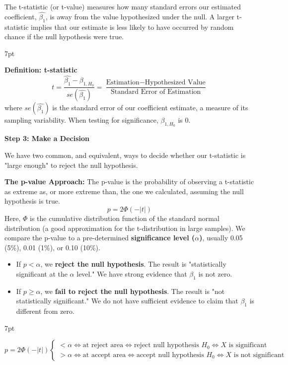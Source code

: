 \documentclass{article}
\providecommand{\tightlist}{
  \setlength{\itemsep}{0pt}
  \setlength{\parskip}{0pt}}
\newenvironment{blueblock}{
\def\FrameCommand{
  \hspace{1pt}
    {\color{DarkBlue}
    \vrule width 2pt}
    {\color{blueshade}
    \vrule width 4pt}
  \colorbox{blueshade}
}
\MakeFramed{
  \advance
  \hsize-
  \width
  \FrameRestore}
\noindent\hspace{-4.55pt}%
\begin{adjustwidth}{}{7pt}
\vspace{2pt}\vspace{2pt}
}
{\vspace{2pt}\end{adjustwidth}\endMakeFramed}
\newenvironment{greenblock}{%
\def\FrameCommand{%
  \hspace{1pt}%
    {\color{Green}%
    \vrule width 2pt}%
    {\color{greenshade}%
    \vrule width 4pt}%
  \colorbox{greenshade}%
}%
\MakeFramed{%
  \advance%
  \hsize-%
  \width%
  \FrameRestore}%
\noindent\hspace{-4.55pt}%
\begin{adjustwidth}{}{7pt}%
\vspace{2pt}\vspace{2pt}%
}
{%
\vspace{2pt}\end{adjustwidth}\endMakeFramed%
}
\begin{document}
The t-statistic (or t-value) measures how many standard errors our estimated coefficient, $\hat{\beta_1}$, is away from the value hypothesized under the null. A larger t-statistic implies that our estimate is less likely to have occurred by random chance if the null hypothesis were true.

\begin{greenblock}
\textbf{Definition: t-statistic}
\begin{equation}
  t=\frac{\hat{\beta_{1}}-\beta_{1, H_0}}{se(\hat{\beta_{1}})}=\frac{\text{Estimation}-\text{Hypothesized Value}}{\text{Standard Error of Estimation}}
\end{equation}
where $se(\hat{\beta_1})$ is the standard error of our coefficient estimate, a measure of its sampling variability. When testing for significance, $\beta_{1, H_0}$ is 0.
\end{greenblock}

\textbf{Step 3:  Make a Decision}

We have two common, and equivalent, ways to decide whether our t-statistic is "large enough" to reject the null hypothesis.


\textbf{The p-value Approach:} The p-value is the probability of observing a t-statistic as extreme as, or more extreme than, the one we calculated, assuming the null hypothesis is true.
\begin{equation}
  p=2 \Phi(-|t|)
\end{equation}
Here, $\Phi$ is the cumulative distribution function of the standard normal distribution (a good approximation for the t-distribution in large samples). We compare the p-value to a pre-determined \textbf{significance level ($\alpha$)}, usually 0.05 (5\%), 0.01 (1\%), or 0.10 (10\%).

\begin{itemize}
\tightlist
  \item If $p < \alpha$, we \textbf{reject the null hypothesis}. The result is "statistically significant at the $\alpha$ level." We have strong evidence that $\beta_1$ is not zero.
  \item If $p \ge \alpha$, we \textbf{fail to reject the null hypothesis}. The result is "not statistically significant." We do not have sufficient evidence to claim that $\beta_1$ is different from zero.
\end{itemize}

\begin{blueblock}
$p=2 \Phi(-|t|) 
\begin{cases}
  < \alpha \iff \text{at reject area} \iff \text{reject null hypothesis $H_0$} \iff \text{$X$ is significant}
  \\
  > \alpha \iff \text{at accept area} \iff \text{accept null hypothesis $H_0$} \iff \text{$X$ is not significant}
\end{cases}$
\end{blueblock}
\end{document}
